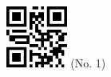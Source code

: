 \documentclass[twocolumn]{article}
\title{}
\date{}
\begin{document}

\begin{center}
 \hspace{0.2cm}
 \includegraphics[width=2cm]{qrcode-1.png}
 \hspace{0.5cm}
 \Large{  (No. 1) }
\end{center}


\end{document}
